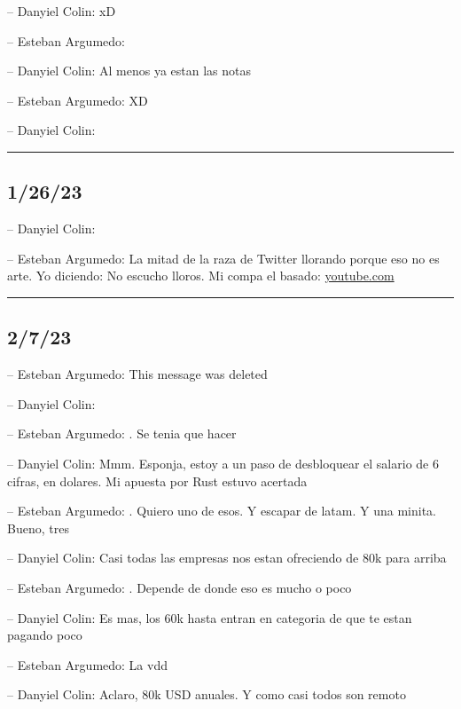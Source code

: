 -- Danyiel Colin: xD

-- Esteban Argumedo:

-- Danyiel Colin: Al menos ya estan las notas

-- Esteban Argumedo: XD

-- Danyiel Colin:

\begin{center}\rule{0.5\linewidth}{0.5pt}\end{center}

\hypertarget{section-181}{%
\subsection{1/26/23}\label{section-181}}

-- Danyiel Colin:

-- Esteban Argumedo: La mitad de la raza de Twitter llorando porque eso
no es arte. Yo diciendo: No escucho lloros. Mi compa el basado:
\href{https://youtube.com/shorts/Z8omJ59hNfY?feature=share}{youtube.com}

\begin{center}\rule{0.5\linewidth}{0.5pt}\end{center}

\hypertarget{section-182}{%
\subsection{2/7/23}\label{section-182}}

-- Esteban Argumedo: This message was deleted

-- Danyiel Colin:

-- Esteban Argumedo: . Se tenia que hacer

-- Danyiel Colin: Mmm. Esponja, estoy a un paso de desbloquear el
salario de 6 cifras, en dolares. Mi apuesta por Rust estuvo acertada

-- Esteban Argumedo: . Quiero uno de esos. Y escapar de latam. Y una
minita. Bueno, tres

-- Danyiel Colin: Casi todas las empresas nos estan ofreciendo de 80k
para arriba

-- Esteban Argumedo: . Depende de donde eso es mucho o poco

-- Danyiel Colin: Es mas, los 60k hasta entran en categoria de que te
estan pagando poco

-- Esteban Argumedo: La vdd

-- Danyiel Colin: Aclaro, 80k USD anuales. Y como casi todos son remoto

